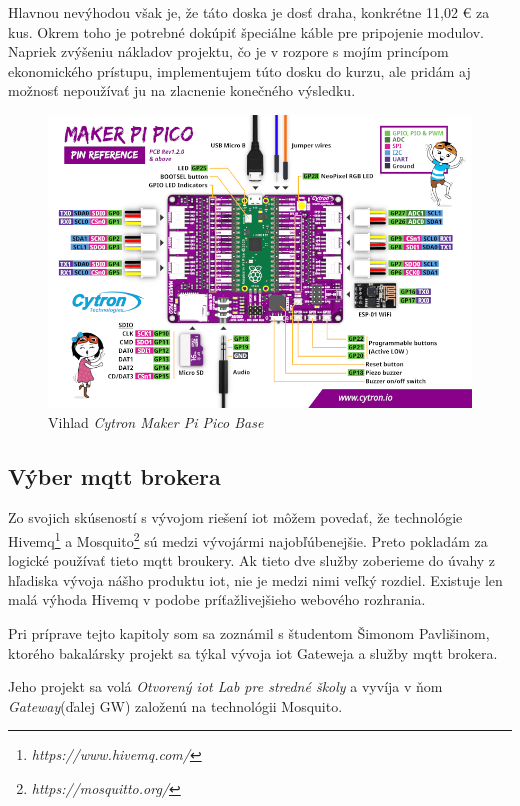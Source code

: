 Hlavnou nevýhodou však je, že táto doska je dosť draha, konkrétne 11,02 € za kus. Okrem toho je potrebné dokúpiť špeciálne káble pre pripojenie modulov. Napriek zvýšeniu nákladov projektu, čo je v rozpore s mojím princípom ekonomického prístupu, implementujem túto dosku do kurzu, ale pridám aj možnosť nepoužívať ju na zlacnenie konečného výsledku.

\begin{figure}[!ht]
    \centering
    \includegraphics[width=.9\textwidth]{figures/piPlata.png}
    \caption{Vihlad \textit{Cytron Maker Pi Pico Base} \label{piPlata}\cite{cytron}}
\end{figure}

\subsection{Výber \gls{mqtt} brokera}
Zo svojich skúseností s vývojom riešení \gls{iot} môžem povedať, že technológie Hivemq\footnote{\textit{https://www.hivemq.com/}} a Mosquito\footnote{\textit{https://mosquitto.org/}} sú medzi vývojármi najobľúbenejšie. Preto pokladám za logické používať tieto \gls{mqtt} broukery. Ak tieto dve služby zoberieme do úvahy z hľadiska vývoja nášho produktu \gls{iot}, nie je medzi nimi veľký rozdiel. Existuje len malá výhoda Hivemq v podobe príťažlivejšieho webového rozhrania. 

Pri príprave tejto kapitoly som sa zoznámil s študentom Šimonom Pavlišinom, ktorého bakalársky projekt sa týkal vývoja \gls{iot} Gateweja a služby \gls{mqtt} brokera. 

Jeho projekt sa volá \textit{Otvorený \gls{iot} Lab pre stredné školy}\cite{bookSimon} a vyvíja v ňom \textit{Gateway}(ďalej GW) založenú na technológii Mosquito. 

